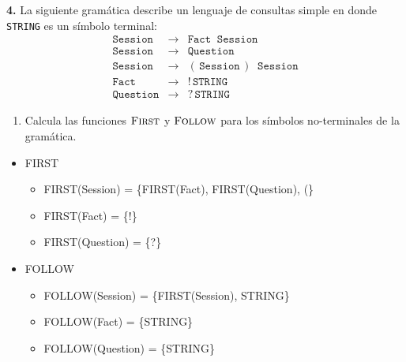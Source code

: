 \textbf{4.} La siguiente gram\'atica describe un lenguaje de consultas simple en
donde \verb=STRING= es un s\'imbolo terminal:
\[
    \begin{array}{rcl}
        \mathtt{Session} &  \to & \mathtt{Fact}\;\;\mathtt{Session} \\
        \mathtt{Session} &  \to & \mathtt{Question} \\
        \mathtt{Session} &  \to & \mathtt{(\,Session\,)}\;\;\mathtt{Session} \\
        \mathtt{Fact}  & \to & \mathtt{!\,STRING}\\
        \mathtt{Question}  & \to & \mathtt{?\,STRING}
    \end{array}
\]
\begin{enumerate}
    \item[] Calcula las funciones $\textsc{First}$ y $\textsc{Follow}$ para los s\'imbolos
    no-terminales de la gram\'atica.
\end{enumerate}

\begin{itemize}

    \item FIRST

        \begin{itemize}

              \item FIRST(Session) = \{FIRST(Fact), FIRST(Question), (\}

              \item FIRST(Fact) = \{!\}

              \item FIRST(Question) = \{?\}

        \end{itemize}

    \item FOLLOW

        \begin{itemize}

            \item FOLLOW(Session) = \{FIRST(Session), STRING\}

            \item FOLLOW(Fact) = \{STRING\}

            \item FOLLOW(Question) = \{STRING\}

        \end{itemize}

\end{itemize}



